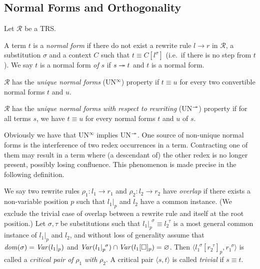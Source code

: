 \subsection{Normal Forms and Orthogonality}

\begin{definition}\label{def:normalisation}%
  Let $\mathcal{R}$ be a TRS.
  \begin{compactenum}
    \item
      A term $t$ is a \emph{normal form} if there do not exist a
      rewrite rule $l \rightarrow r$ in $\mathcal{R}$, a substitution
      $\sigma$ and a context $C$ such that $t \equiv C[l^\sigma]$
      (i.e.\ if there is no step from $t$). We say $t$ is a normal
      form \emph{of} $s$ if $s \twoheadrightarrow t$ and $t$ is a normal form.
    \item
      $\mathcal{R}$ has the \emph{unique normal forms}
      (UN$^\infty$) property if $t \equiv u$ for every two
      convertible normal forms $t$ and $u$.
    \item
      $\mathcal{R}$ has the \emph{unique normal forms
      with respect to rewriting} (UN$^{\twoheadrightarrow}$) property if for all
      terms $s$, we have $t \equiv u$ for every normal forms $t$ and
      $u$ of $s$.
  \end{compactenum}
\end{definition}

Obviously we have that UN$^\infty$ implies UN$^{\twoheadrightarrow}$. One source
of non-unique normal forms is the interference of two redex occurrences
in a term. Contracting one of them may result in a term where (a
descendant of) the other redex is no longer present, possibly losing
confluence. This phenomenon is made precise in the following
definition.

\begin{definition}\label{def:overlap}%
We say two rewrite rules $\rho_1 : l_1 \rightarrow r_1$ and $\rho_2 :
l_2 \rightarrow r_2$ have \emph{overlap} if there exists a
non-variable position $p$ such that $l_1 |_p$ and $l_2$ have a common
instance. (We exclude the trivial case of overlap between a rewrite
rule and itself at the root position.)
Let $\sigma, \tau$ be substitutions such that $l_1 |_p ^{\,\;\sigma}
\equiv l_2 ^{\,\;\tau}$ is a most general common instance of $l_1 |_p$
and $l_2$, and without loss of generality assume that $\mathit{dom}(\sigma) =
\mathit{Var}(l_1 |_p)$ and $\mathit{Var}(l_1 |_p ^{\,\;\sigma}) \cap \mathit{Var}(l_1[\Box]_p)
= \varnothing$. Then $\langle l_1 ^{\,\;\sigma}[r_2^{\,\;\tau}]_p,
r_1^{\,\;\sigma} \rangle$ is called a \emph{critical pair of} $\rho_1$
\emph{with} $\rho_2$. A critical pair $\langle s, t \rangle$ is called
\emph{trivial} if $s \equiv t$.
\end{definition}

